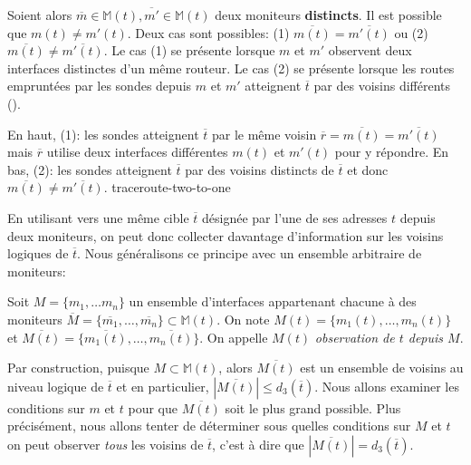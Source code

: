 Soient alors $\overline{m} \in \mathbb{M}(t), \overline{m'} \in \mathbb{M}(t)$
deux moniteurs {\bf distincts}. Il est possible que $m(t) \neq m'(t)$.
Deux cas sont possibles: (1) $\overline{m(t)} = \overline{m'(t)}$ ou (2)
$\overline{m(t)} \neq \overline{m'(t)}$. Le cas (1) se présente lorsque $m$ et
$m'$ observent deux interfaces distinctes d'un même routeur. Le cas (2) se
présente lorsque les routes empruntées par les sondes \traceroute depuis $m$ et
$m'$ atteignent $\overline{t}$ par des voisins différents
().

 {En haut, (1):
les sondes \traceroute atteignent $\overline{t}$ par le même voisin
$\overline{r} = \overline{m(t)} = \overline{m'(t)}$ mais $\overline{r}$ utilise
deux interfaces différentes $m(t)$ et $m'(t)$ pour y répondre. En bas, (2): les
sondes \traceroute atteignent $\overline{t}$ par des voisins distincts de
$\overline{t}$ et donc $\overline{m(t)} \neq \overline{m'(t)}$.}
{traceroute-two-to-one}

En utilisant \traceroute vers une même cible $\overline{t}$ désignée par l'une
de ses adresses $t$ depuis deux moniteurs, on peut donc collecter davantage
d'information sur les voisins logiques de $\overline{t}$. Nous généralisons ce
principe avec un ensemble arbitraire de moniteurs:

\begin{definition} Soit
$M = \{m_1, \ldots m_n\}$ un ensemble d'interfaces appartenant chacune à des
moniteurs $\overline{M} = \{\overline{m_1}, \ldots, \overline{m_n}\} \subset
\mathbb{M}(t)$.
On note $M(t) = \{m_1(t), \ldots, m_n(t)\}$ et $\overline{M(t)} =
\{\overline{m_1(t)}, \ldots, \overline{m_n(t)}\}$. On appelle $M(t)$ {\em
observation de $t$ depuis $M$}.
\label{def:traceroute-many-to-one}
\end{definition}

Par construction, puisque $M \subset \mathbb{M}(t)$, alors $\overline{M(t)}$ est
un ensemble de voisins au niveau logique de $\overline{t}$ et en particulier,
$|\overline{M(t)}| \leq d_3(\overline{t})$.
Nous allons examiner les conditions sur $m$ et $t$ pour que $\overline{M(t)}$
soit le plus grand possible. Plus précisément, nous allons tenter de déterminer
sous quelles conditions sur $M$ et $t$ on peut observer {\em tous} les voisins
de $\overline{t}$, c'est à dire que $|\overline{M(t)}| = d_3(\overline{t})$.

